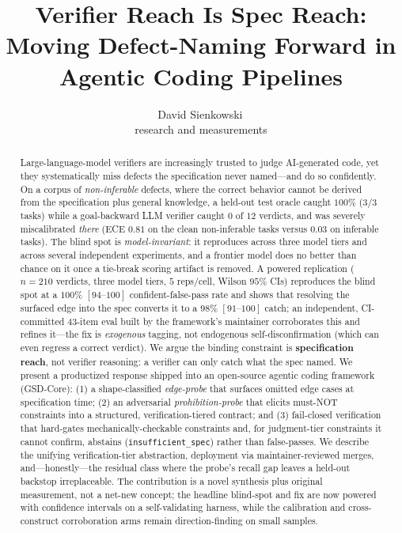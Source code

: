 \documentclass[11pt]{article}
\title{\textbf{Verifier Reach Is Spec Reach:}\\[2pt]
       Moving Defect-Naming Forward in Agentic Coding Pipelines}
\author{David Sienkowski\,\orcidlink{0009-0007-5143-8925}\\\small research and measurements}
\date{}
\newcommand{\code}[1]{\texttt{#1}}
\begin{document}
\maketitle

\begin{abstract}
Large-language-model verifiers are increasingly trusted to judge AI-generated code, yet they
systematically miss defects the specification never named---and do so confidently. On a corpus of
\emph{non-inferable} defects, where the correct behavior cannot be derived from the specification
plus general knowledge, a held-out test oracle caught $100\%$ ($3/3$ tasks) while a goal-backward
LLM verifier caught $0$ of $12$ verdicts, and was severely miscalibrated \emph{there}
(ECE $0.81$ on the clean non-inferable tasks versus $0.03$ on inferable tasks). The blind spot is
\emph{model-invariant}: it reproduces across three model tiers and across several independent
experiments, and a frontier model does no better than chance on it once a tie-break scoring artifact
is removed. A powered replication ($n=210$
verdicts, three model tiers, $5$ reps/cell, Wilson $95\%$ CIs) reproduces the blind spot at a
$100\%$ $[94\text{--}100]$ confident-false-pass rate and shows that resolving the surfaced edge into
the spec converts it to a $98\%$ $[91\text{--}100]$ catch; an independent,
CI-committed $43$-item eval built by the framework's maintainer corroborates this and refines it---the
fix is \emph{exogenous} tagging, not endogenous self-disconfirmation (which can even regress a correct
verdict). We argue the binding constraint
is \textbf{specification reach}, not verifier reasoning: a verifier can only catch what the spec
named. We present a productized response shipped into an open-source agentic coding framework
(GSD-Core): (1) a shape-classified \emph{edge-probe} that surfaces omitted edge cases at
specification time; (2) an adversarial \emph{prohibition-probe} that elicits must-NOT constraints
into a structured, verification-tiered contract; and (3) fail-closed verification that hard-gates
mechanically-checkable constraints and, for judgment-tier constraints it cannot confirm, abstains
(\code{insufficient\_spec}) rather than false-passes. We describe the unifying verification-tier
abstraction, deployment via maintainer-reviewed merges, and---honestly---the residual class where the
probe's recall gap leaves a held-out backstop irreplaceable. The contribution is a novel synthesis
plus original measurement, not a net-new concept; the headline blind-spot and fix are now powered with
confidence intervals on a self-validating harness, while the calibration and cross-construct corroboration
arms remain direction-finding on small samples.
\end{abstract}
\end{document}

